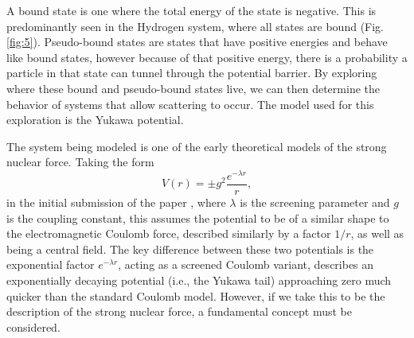 \documentclass[%
 reprint,
nofootinbib,
 amsmath,amssymb,
 aps,
floatfix,
]{revtex4-2}
\begin{document}
{
  A bound state is one where the total energy of the state is negative. 
  This is predominantly seen in the Hydrogen system, where all states are bound (Fig. \ref{fig:5}). 
  Pseudo-bound states are states that have positive energies and behave like bound states, however because of that positive energy, there is a probability a particle in that state can tunnel through the potential barrier. 
  By exploring where these bound and pseudo-bound states live, we can then determine the behavior of systems that allow scattering to occur. 
  The model used for this exploration is the Yukawa potential.

  The system being modeled is one of the early theoretical models of the strong nuclear force. 
  Taking the form 
  \begin{equation}
    V(r) = \pm g^2 \frac{e^{-\lambda r}}{r}, \label{eq:1}
  \end{equation}
  in the initial submission of the paper \cite{yuk1935}, where $\lambda$ is the screening parameter and $g$ is the coupling constant, this assumes the potential to be of a similar shape to the electromagnetic Coulomb force, described similarly by a factor $1/r$, as well as being a central field. 
  The key difference between these two potentials is the exponential factor $e^{-\lambda r}$, acting as a screened Coulomb variant, describes an exponentially decaying potential (i.e., the Yukawa tail) approaching zero much quicker than the standard Coulomb model. 
  However, if we take this to be the description of the strong nuclear force, a fundamental concept must be considered. 
  
}
\end{document}
